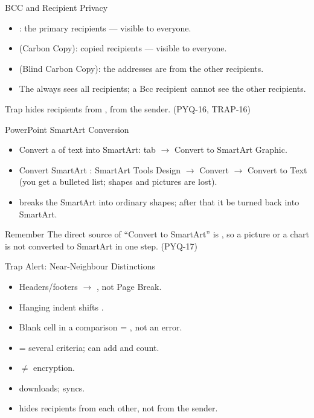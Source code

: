 \documentclass[aspectratio=169]{beamer}
\begin{document}
\begin{frame}{BCC and Recipient Privacy}
  \begin{itemize}
    \item {}: the primary recipients --- visible to everyone.
    \item {} (Carbon Copy): copied recipients --- visible to everyone.
    \item {} (Blind Carbon Copy): the addresses are  from
      the other recipients.
    \item The  always sees all recipients; a Bcc recipient cannot
      see the other recipients.
  \end{itemize}
  \begin{alertblock}{Trap}
     hides recipients from ,  from the
    sender. (PYQ-16, TRAP-16)
  \end{alertblock}
\end{frame}

\begin{frame}{PowerPoint SmartArt Conversion}
  \begin{itemize}
    \item Convert a  of text into SmartArt: 
      tab $\rightarrow$ Convert to SmartArt Graphic.
    \item Convert SmartArt : SmartArt Tools Design
      $\rightarrow$ Convert $\rightarrow$ Convert to Text (you get a bulleted
      list; shapes and pictures are lost).
    \item {} breaks the SmartArt into ordinary shapes;
      after that it  be turned back into SmartArt.
  \end{itemize}
  \begin{block}{Remember}
    The direct source of ``Convert to SmartArt'' is , so a picture
    or a chart is not converted to SmartArt in one step. (PYQ-17)
  \end{block}
\end{frame}

\begin{frame}{Trap Alert: Near-Neighbour Distinctions}
  \begin{itemize}
    \item Headers/footers $\rightarrow$ , not Page Break.
    \item Hanging indent shifts .
    \item Blank cell in a comparison = , not an error.
    \item {} = several criteria;  can add and
      count.
    \item {} $\neq$ encryption.
    \item {} downloads;  syncs.
    \item {} hides recipients from each other, not from the sender.
  \end{itemize}
\end{frame}
\end{document}
